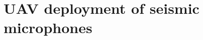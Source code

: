 \chapter[UAV deploying Smartdarts]{UAV deployment of seismic microphones}

%
%
%

%

%

%

%

%

%
%
%
%
%
%
%
%
